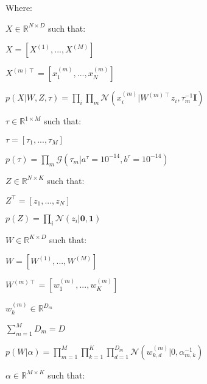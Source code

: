 \documentclass{article}
\begin{document}
\begin{description}

\item Where:

\item $X \in \mathbb{R}^{N \times D}$ such that:

	\begin{description}
	\item $X = [X^{(1)},...,X^{(M)}]$
	\item $X^{(m)\intercal} = [x_1^{(m)},...,x_N^{(m)}]$
	\item $p(X|W,Z,\tau) = \prod_i{\prod_m{\mathcal{N}(x_i^{(m)}|W^{(m)\intercal}z_i, \tau_m^{-1}\textbf{I})}}$
	\end{description}

\item $\tau \in \mathbb{R}^{1 \times M}$ such that:

	\begin{description}
	\item $\tau = [\tau_1,...,\tau_M]$
	\item $p(\tau) = \prod_m{\mathcal{G}(\tau_m|a^\tau=10^{-14}, b^\tau=10^{-14})}$
	\end{description}

\item $Z \in \mathbb{R}^{N \times K}$ such that:

	\begin{description}
	\item $Z^\intercal = [z_1,...,z_N]$
	\item $p(Z) = \prod_i{\mathcal{N}(z_i|\textbf{0}, \textbf{1})}$
	\end{description}

\item $W \in \mathbb{R}^{K \times D}$ such that:

	\begin{description}
	\item $W = [W^{(1)},...,W^{(M)}]$
	\item $W^{(m)\intercal} = [w_1^{(m)},...,w_K^{(m)}]$
	\item $w_k^{(m)} \in \mathbb{R}^{D_m}$
	\item $\sum_{m=1}^M{D_m} = D$
	\item $p(W|\alpha) = \prod_{m=1}^M{\prod_{k=1}^K{\prod_{d=1}^{D_m}{\mathcal{N}(w_{k,d}^{(m)}|0, \alpha_{m,k}^{-1})}}}$
	\end{description}

\item $\alpha \in \mathbb{R}^{M \times K}$ such that:
	

\end{description}
\end{document}
